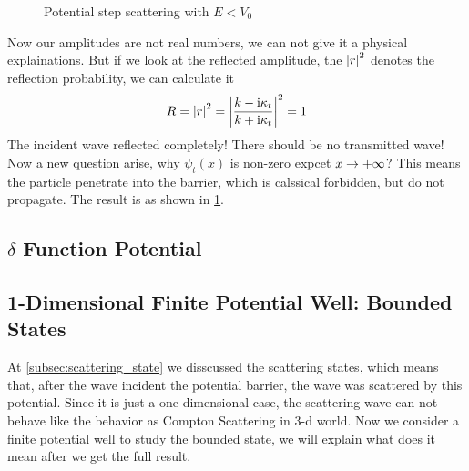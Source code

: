 \begin{enumerate}
\begin{figure}[h]
        \caption{Potential step scattering with $E<V_0$}
        \label{fig:scattering_forbidden}
    \end{figure}
    Now our amplitudes are not real numbers, we can not give it a physical explainations. But if we look at the reflected amplitude, the $\left| r \right|^2$ denotes the reflection probability, we can calculate it 
    \begin{eqnarray}
        R = \left| r \right|^2 = \left| \frac{k - \mathrm{i} \kappa_t}{k + \mathrm{i} \kappa_t} \right|^2 = 1
    \end{eqnarray}
    The incident wave reflected completely! There should be no transmitted wave! Now a new question arise, why $\psi_t(x)$ is non-zero expcet $x \rightarrow + \infty$? This means the particle penetrate into the barrier, which is calssical forbidden, but do not propagate. The result is as shown in \cref{fig:scattering_forbidden}.
\end{enumerate}
\subsection{\texorpdfstring{$\delta$}{delta} Function Potential} \label{subsec:delta_potential}




\subsection{1-Dimensional Finite Potential Well: Bounded States}

At \cref{subsec:scattering_state} we disscussed the scattering states, which means that, after the wave incident the potential barrier, the wave was scattered by this potential. Since it is just a one dimensional case, the scattering wave can not behave like the behavior as Compton Scattering in 3-d world. Now we consider a finite potential well to study the bounded state, we will explain what does it mean after we get the full result.

